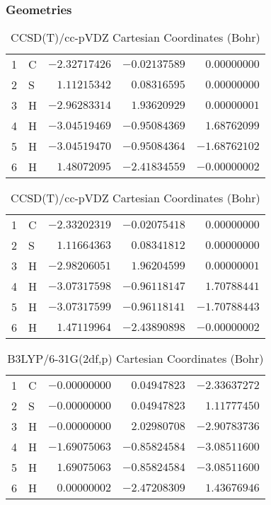 \documentclass[10pt,oneside]{article}
\begin{document}
\begin{table}[h!]
\subsubsection*{Geometries}
\begin{multicols}{2}
\centering
\caption{CCSD(T)/cc-pVTZ Cartesian Coordinates (Bohr)}
\begin{tabular}{llrrr}
\toprule
1  & C  & $-2.32717426$ & $-0.02137589$ & $ 0.00000000$ \\
2  & S  & $ 1.11215342$ & $ 0.08316595$ & $ 0.00000000$ \\
3  & H  & $-2.96283314$ & $ 1.93620929$ & $ 0.00000001$ \\
4  & H  & $-3.04519469$ & $-0.95084369$ & $ 1.68762099$ \\
5  & H  & $-3.04519470$ & $-0.95084364$ & $-1.68762102$ \\
6  & H  & $ 1.48072095$ & $-2.41834559$ & $-0.00000002$ \\
\bottomrule
\end{tabular}
\caption{CCSD(T)/cc-pVDZ Cartesian Coordinates (Bohr)}
\begin{tabular}{llrrr}
\toprule
1  & C  & $-2.33202319$ & $-0.02075418$ & $ 0.00000000$ \\
2  & S  & $ 1.11664363$ & $ 0.08341812$ & $ 0.00000000$ \\
3  & H  & $-2.98206051$ & $ 1.96204599$ & $ 0.00000001$ \\
4  & H  & $-3.07317598$ & $-0.96118147$ & $ 1.70788441$ \\
5  & H  & $-3.07317599$ & $-0.96118141$ & $-1.70788443$ \\
6  & H  & $ 1.47119964$ & $-2.43890898$ & $-0.00000002$ \\
\bottomrule
\end{tabular}
\end{multicols}
\end{table}

\begin{table}[h]
\centering
\caption{B3LYP/6-31G(2df,p) Cartesian Coordinates (Bohr)}
\begin{tabular}{llrrr}
\toprule
1  & C  & $-0.00000000$ & $ 0.04947823$ & $-2.33637272$ \\
2  & S  & $-0.00000000$ & $ 0.04947823$ & $ 1.11777450$ \\
3  & H  & $-0.00000000$ & $ 2.02980708$ & $-2.90783736$ \\
4  & H  & $-1.69075063$ & $-0.85824584$ & $-3.08511600$ \\
5  & H  & $ 1.69075063$ & $-0.85824584$ & $-3.08511600$ \\
6  & H  & $ 0.00000002$ & $-2.47208309$ & $ 1.43676946$ \\
\bottomrule
\end{tabular}
\end{table}
\end{document}
